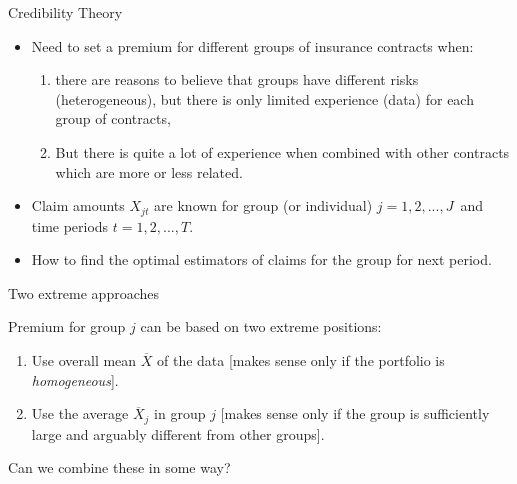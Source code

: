 \documentclass[11pt]{beamer}
\begin{document}
\begin{frame}{Credibility Theory}

\begin{itemize}
\item Need to set a premium for different groups of insurance contracts when:
\begin{enumerate}
\item there are reasons to believe that groups have different risks (heterogeneous), but there is only limited \alert{experience} (data) for each group of contracts,


\item But there is quite a lot of experience when combined with other contracts which are more or less related.
\end{enumerate}

\vfill


\item Claim amounts $X_{jt}$ are known for group (or individual) $j=1,2,...,J$\ and time periods $t=1,2,...,T$.

\vfill


\item How to find the optimal estimators of claims for the group for next period.

\end{itemize}
\end{frame}
\begin{frame}{Two extreme approaches}

Premium for group $j$ can be based on two extreme positions:

\vfill



\begin{enumerate}


\item Use overall mean $\overline{X}$ of the data [makes sense only if the portfolio is \textit{homogeneous}].


\vfill


\item Use the average $\overline{X}_{j}$ in group $j$ [makes sense only if the group is sufficiently large and arguably different from other groups].

\end{enumerate}

\vfill

Can we combine these in some way?

\end{frame}
\end{document}
